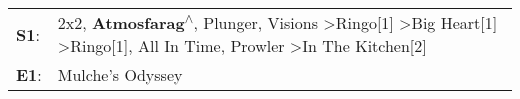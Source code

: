 \begin{supertabular}{p{0.03\textwidth}p{0.92\textwidth}}
 \textbf{S1}:  &  2x2\textsuperscript{}, \enspace \textbf{Atmosfarag\textsuperscript{$\wedge$}}, \enspace Plunger\textsuperscript{}, \enspace Visions\textsuperscript{} \textgreater \enspace Ringo[1]\textsuperscript{} \textgreater \enspace Big Heart[1]\textsuperscript{} \textgreater \enspace Ringo[1]\textsuperscript{}, \enspace All In Time\textsuperscript{}, \enspace Prowler\textsuperscript{} \textgreater \enspace In The Kitchen[2]\textsuperscript{}  \enspace  \\
 \textbf{E1}:  &                                                                                                                                                                                                                                                                                                                                                                                                                  Mulche's Odyssey\textsuperscript{}  \enspace  \\
\end{supertabular}
